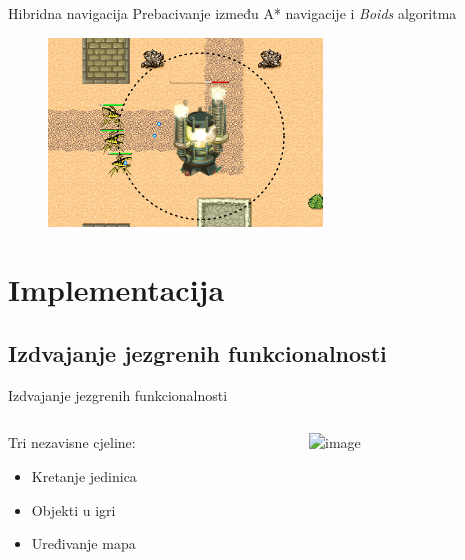 \documentclass[utf8]{beamer}
\begin{document}
\begin{frame}{Hibridna navigacija}
    Prebacivanje između A* navigacije i \textit{Boids} algoritma
    \begin{figure}[h]
        \centering
        \includegraphics[height=5cm]{images/boidsEnemySeparation.pdf}
    \end{figure}
\end{frame}

\section{Implementacija}

\subsection{Izdvajanje jezgrenih funkcionalnosti}

\begin{frame}{Izdvajanje jezgrenih funkcionalnosti}
    \begin{columns}[c]
        \begin{column}{0.35\textwidth}
            Tri nezavisne cjeline:
            \begin{itemize}
                \item<1-> Kretanje jedinica
                \item<2-> Objekti u igri
                \item<3-> Uređivanje mapa
            \end{itemize}
        \end{column}

        \begin{column}{0.65\textwidth}
            \includegraphics<2->[width=1.0\textwidth]{images/umlObjects.png}
        \end{column}
    \end{columns}
\end{frame}
\end{document}
